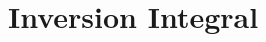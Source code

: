 \documentclass[12pt,a4paper,oneside]{book}
\theoremstyle{definition}
\begin{document}


\chapter{Inversion Integral}\label{inversion-integral}
\end{document}
